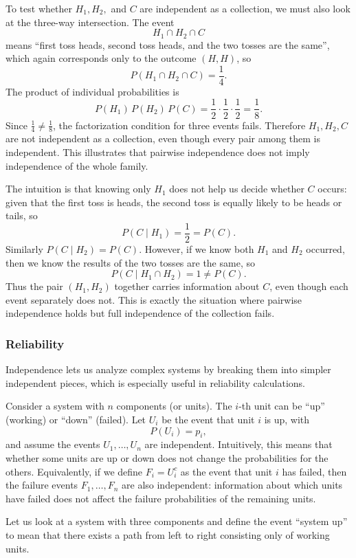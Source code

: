 To test whether \(H_1, H_2,\) and \(C\) are independent as a collection, we must also look at the three-way intersection. The event
\[
H_1 \cap H_2 \cap C
\]
means “first toss heads, second toss heads, and the two tosses are the same”, which again corresponds only to the outcome \((H,H)\), so
\[
P(H_1 \cap H_2 \cap C) = \frac{1}{4}.
\]
The product of individual probabilities is
\[
P(H_1)\,P(H_2)\,P(C) = \frac{1}{2}\cdot\frac{1}{2}\cdot\frac{1}{2} = \frac{1}{8}.
\]
Since \(\frac{1}{4} \neq \frac{1}{8}\), the factorization condition for three events fails. Therefore \(H_1, H_2, C\) are not independent as a collection, even though every pair among them is independent. This illustrates that pairwise independence does not imply independence of the whole family.

The intuition is that knowing only \(H_1\) does not help us decide whether \(C\) occurs: given that the first toss is heads, the second toss is equally likely to be heads or tails, so
\[
P(C \mid H_1) = \frac{1}{2} = P(C).
\]
Similarly \(P(C \mid H_2) = P(C)\). However, if we know both \(H_1\) and \(H_2\) occurred, then we know the results of the two tosses are the same, so
\[
P(C \mid H_1 \cap H_2) = 1 \neq P(C).
\]
Thus the pair \((H_1,H_2)\) together carries information about \(C\), even though each event separately does not. This is exactly the situation where pairwise independence holds but full independence of the collection fails.


\subsubsection{Reliability}

Independence lets us analyze complex systems by breaking them into simpler independent pieces, which is especially useful in reliability calculations.

Consider a system with \(n\) components (or units). The \(i\)-th unit can be “up” (working) or “down” (failed). Let \(U_i\) be the event that unit \(i\) is up, with
\[
P(U_i) = p_i,
\]
and assume the events \(U_1, \dots, U_n\) are independent. Intuitively, this means that whether some units are up or down does not change the probabilities for the others. Equivalently, if we define \(F_i = U_i^c\) as the event that unit \(i\) has failed, then the failure events \(F_1, \dots, F_n\) are also independent: information about which units have failed does not affect the failure probabilities of the remaining units.

Let us look at a system with three components and define the event “system up” to mean that there exists a path from left to right consisting only of working units.


